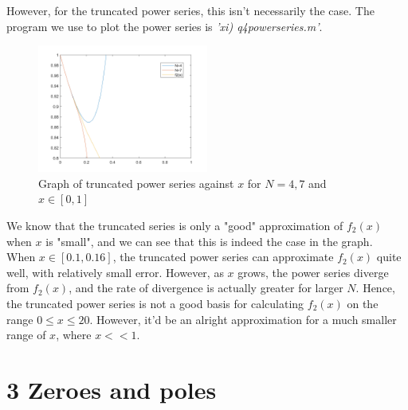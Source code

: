 \documentclass[10pt]{article}
\begin{document}
However, for the truncated power series, this isn't necessarily the case. The program we use to plot the power series is \emph{'xi) q4\textunderscore power\textunderscore series.m'}.\\
\begin{figure}[H]
\centering
\includegraphics[width=0.5\textwidth]{Files/q4,N=4,7.png}
\caption{Graph of truncated power series against $x$ for $N=4,7$ and $x\in[0,1]$}
\end{figure}
\noindent We know that the truncated series is only a "good" approximation of $f_2(x)$ when $x$ is "small", and we can see that this is indeed the case in the graph.\\
When $x\in[0.1,0.16]$, the truncated power series can approximate $f_2(x)$ quite well, with relatively small error. However, as $x$ grows, the power series diverge from $f_2(x)$, and the rate of divergence is actually greater for larger $N$. Hence, the truncated power series is not a good basis for calculating $f_2(x)$ on the range $0\leq x\leq 20$. However, it'd be an alright approximation for a much smaller range of $x$, where $x<<1$.


\section*{3 Zeroes and poles}
\medskip
\end{document}
